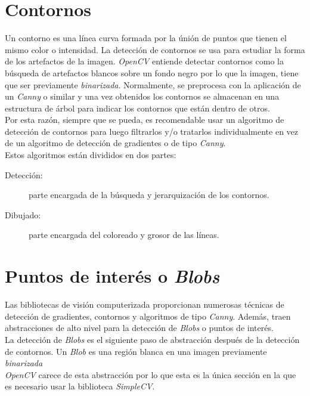 \section{Contornos}
Un contorno es una línea curva formada por la únión de puntos que
tienen el mismo color o intensidad. La detección de contornos se usa
para estudiar la forma de los artefactos de la imagen. \emph{OpenCV}
entiende detectar contornos como la búsqueda de artefactos blancos
sobre un fondo negro por lo que la imagen, tiene que ser previamente
\emph{binarizada}. Normalmente, se preprocesa con la aplicación de un
\emph{Canny} o similar y una vez obtenidos los contornos se almacenan
en una estructura de árbol para indicar los contornos que están dentro
de otros. \\
Por esta razón, siempre que se pueda, es recomendable usar un
algoritmo de detección de contornos para luego filtrarlos y/o
tratarlos individualmente en vez de un algoritmo de detección de
gradientes o de tipo \emph{Canny}.\\
Estos algoritmos están divididos en dos partes:
\begin{description}
\item[Detección:] parte encargada de la búsqueda y jerarquización de
  los contornos.
\item[Dibujado:] parte encargada del coloreado y grosor de las líneas.
\end{description}

\section{Puntos de interés o \emph{Blobs}}
Las bibliotecas de visión computerizada proporcionan numerosas
técnicas de detección de gradientes, contornos y algoritmos de tipo
\emph{Canny}. Además, traen abstracciones de alto nivel para la
detección de \emph{Blobs} o puntos de interés. \\
La detección de \emph{Blobs} es el siguiente paso de abstracción
después de la detección de contornos. Un \emph{Blob} es una región
blanca en una imagen previamente \emph{binarizada} \\
\emph{OpenCV} carece de esta abstracción por lo que esta es la única
sección en la que es necesario usar la biblioteca \emph{SimpleCV}.
